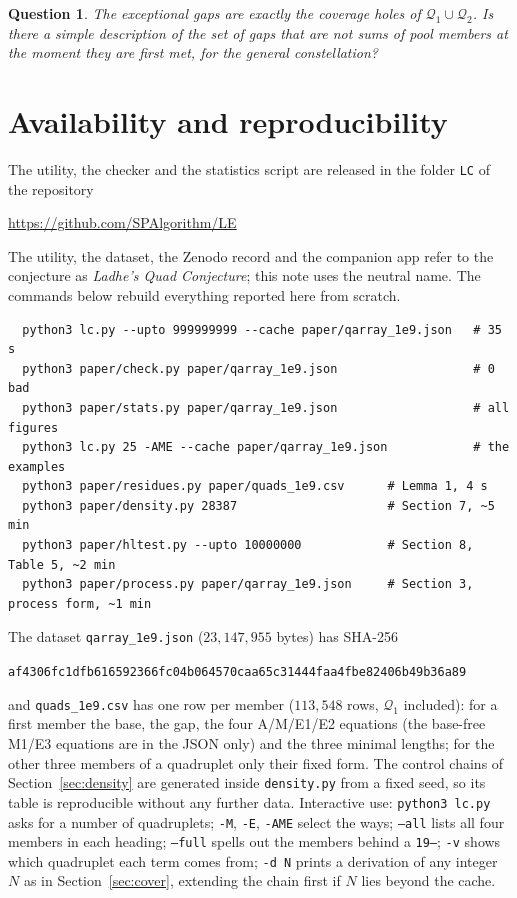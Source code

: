 \documentclass[11pt,a4paper]{article}
\newtheorem{question}{Question}
\newcommand{\Q}{\mathcal{Q}}
\newcommand{\code}[1]{\texttt{#1}}
\begin{document}
\begin{question}
The exceptional gaps are exactly the coverage holes of $\Q_1\cup\Q_2$. Is
there a simple description of the set of gaps that are not sums of pool
members at the moment they are first met, for the general constellation?
\end{question}

\section{Availability and reproducibility}
\label{sec:avail}

The utility, the checker and the statistics script are released in the
folder \code{LC} of the repository
\begin{center}\url{https://github.com/SPAlgorithm/LE}\end{center}
The utility, the dataset, the Zenodo record and the companion app refer
to the conjecture as \emph{Ladhe's Quad Conjecture}; this note uses the
neutral name. The commands below rebuild everything reported here from
scratch.
\begin{small}\begin{verbatim}
  python3 lc.py --upto 999999999 --cache paper/qarray_1e9.json   # 35 s
  python3 paper/check.py paper/qarray_1e9.json                   # 0 bad
  python3 paper/stats.py paper/qarray_1e9.json                   # all figures
  python3 lc.py 25 -AME --cache paper/qarray_1e9.json            # the examples
  python3 paper/residues.py paper/quads_1e9.csv      # Lemma 1, 4 s
  python3 paper/density.py 28387                     # Section 7, ~5 min
  python3 paper/hltest.py --upto 10000000            # Section 8, Table 5, ~2 min
  python3 paper/process.py paper/qarray_1e9.json     # Section 3, process form, ~1 min
\end{verbatim}\end{small}
The dataset \code{qarray\_1e9.json} ($23{,}147{,}955$ bytes) has SHA-256
\begin{center}\footnotesize\code{af4306fc1dfb616592366fc04b064570caa65c31444faa4fbe82406b49b36a89}\end{center}
and \code{quads\_1e9.csv} has one row per member ($113{,}548$ rows,
$\Q_1$ included): for a first member the base, the gap, the four A/M/E1/E2
equations (the base-free M1/E3 equations are in the JSON only) and the
three minimal lengths; for the other three members of a quadruplet only
their fixed form. The control chains of Section~\ref{sec:density} are generated inside
\code{density.py} from a fixed seed, so its table is reproducible without
any further data. Interactive use: \code{python3 lc.py} asks for a number of
quadruplets; \code{-M}, \code{-E}, \code{-AME} select the ways;
\code{--all} lists all four members in each heading; \code{--full} spells out
the members behind a \code{19--}; \code{-v} shows which
quadruplet each term comes from; \code{-d N} prints a derivation of any
integer $N$ as in Section~\ref{sec:cover}, extending the chain first if $N$
lies beyond the cache.
\end{document}
